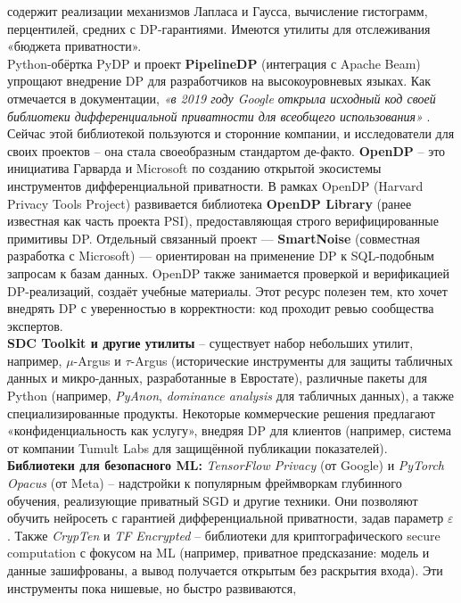 содержит реализации механизмов Лапласа и Гаусса, вычисление гистограмм, перцентилей, средних с DP-гарантиями. Имеются
утилиты для отслеживания «бюджета приватности».\\
Python-обёртка PyDP и проект \textbf{PipelineDP} (интеграция с Apache Beam) упрощают внедрение DP для разработчиков на высокоуровневых языках. Как отмечается в документации, \textit{«в 2019 году Google открыла исходный код своей библиотеки дифференциальной приватности для всеобщего использования»}
\autocite{pydp-readthedocs-io}. Сейчас этой библиотекой пользуются и сторонние компании, и исследователи для своих
проектов – она стала своеобразным стандартом де-факто.
\textbf{OpenDP} \autocite{opendp} – это инициатива Гарварда и Microsoft по созданию открытой экосистемы инструментов дифференциальной приватности. В рамках OpenDP (Harvard Privacy Tools Project) развивается библиотека \textbf{OpenDP Library} (ранее известная как часть проекта PSI), предоставляющая строго верифицированные примитивы DP. Отдельный связанный проект — \textbf{SmartNoise} \autocite{smartnoise} (совместная разработка с Microsoft) — ориентирован на применение DP к SQL-подобным запросам к базам данных. OpenDP также занимается проверкой и верификацией DP-реализаций, создаёт учебные материалы. Этот
ресурс полезен тем, кто хочет внедрять DP с уверенностью в корректности: код проходит ревью сообщества экспертов.\\
\textbf{SDC Toolkit и другие утилиты} – существует набор небольших утилит, например, $\mu$-Argus и $\tau$-Argus
(исторические инструменты для защиты табличных данных и микро-данных, разработанные в Евростате), различные пакеты для
Python (например, \textit{PyAnon}, \textit{dominance analysis} для табличных данных), а также специализированные
продукты. Некоторые коммерческие решения предлагают «конфиденциальность как услугу», внедряя DP для клиентов (например,
система от компании Tumult Labs для защищённой публикации показателей).\\
\textbf{Библиотеки для безопасного ML:}
\textit{TensorFlow Privacy} (от Google) и \textit{PyTorch Opacus} (от Meta) – надстройки к популярным фреймворкам
глубинного обучения, реализующие приватный SGD и другие техники. Они позволяют обучить нейросеть с гарантией
дифференциальной приватности, задав параметр $\varepsilon$. Также \textit{CrypTen} и \textit{TF Encrypted} – библиотеки
для криптографического secure computation с фокусом на ML (например, приватное предсказание: модель и данные
зашифрованы, а вывод получается открытым без раскрытия входа). Эти инструменты пока нишевые, но быстро развиваются,
